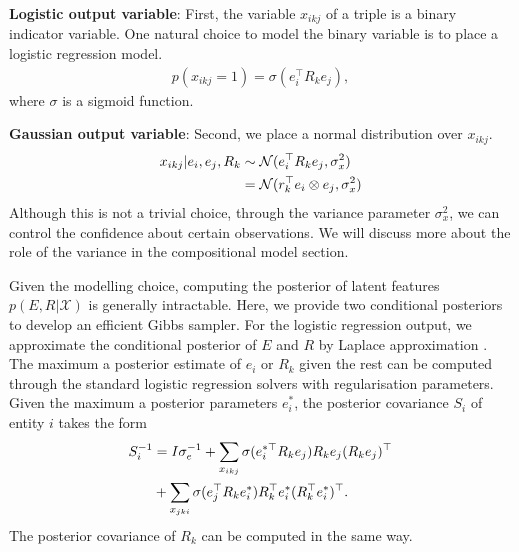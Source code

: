 \textbf{Logistic output variable}: First, the variable $x_{ikj}$ of a triple is a 
binary indicator variable. One natural choice to model the binary variable is to 
place a logistic regression model.
\begin{align}
p(x_{ikj}=1) = \sigma(e_i^{\top} R_k e_j),
\end{align}
where $\sigma$ is a sigmoid function.

\textbf{Gaussian output variable}:
Second, we place a normal distribution over $x_{ikj}$.
\begin{align}
\label{eqn:triple_gen}
x_{ikj} |e_i, e_j, R_k &\sim \mathcal{N}(e_i^{\top} R_k e_j, \sigma_x^2)\\
& = \mathcal{N}(r_k^{\top} e_i \otimes e_j, \sigma_x^2) \notag
\end{align}
Although this is not a trivial choice, through the variance parameter $
\sigma_x^2$, we can control the confidence about certain observations. We will 
discuss more about the role of the variance in the compositional model section.

Given the modelling choice, computing the posterior of latent features $p(E, R|
\mathcal{X})$ is generally intractable. Here, we provide two conditional 
posteriors to develop an efficient Gibbs sampler.
For the logistic regression output, we approximate the conditional posterior of 
$E$ and $R$ by Laplace approximation \cite{bishop2006pattern}. The maximum a 
posterior estimate of $e_i$ or $R_k$ given the rest can be computed through the 
standard logistic regression solvers with regularisation parameters. Given the 
maximum a posterior parameters $e_i^*$, the posterior covariance $S_i$ of entity 
$i$ takes the form
\begin{align}
S_i^{-1}& = I\sigma_e^{-1} + \sum_{x_{ikj}} \sigma(e_{i}^{*\top} R_k e_{j}) R_k 
e_{j}(R_k e_{j})^\top \notag \\
& + \sum_{x_{jki}} \sigma(e_{j}^{\top} R_k e_{i}^*) R_k^\top e^*_{i}(R_k^\top 
e^*_{i})^\top.
\end{align}
The posterior covariance of $R_k$ can be computed in the same way.

